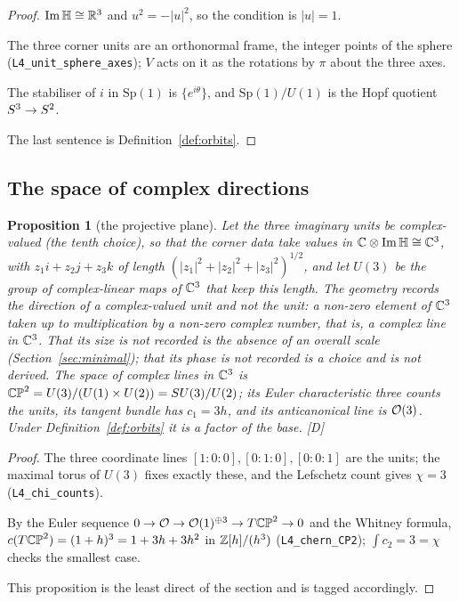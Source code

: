 \documentclass[11pt,a4paper]{article}
\theoremstyle{plain}
\newtheorem{proposition}[theorem]{Proposition}
\theoremstyle{definition}
\theoremstyle{remark}
\newcommand{\Hquat}{\mathbb{H}}
\newcommand{\ImH}{\operatorname{Im}\Hquat}
\newcommand{\rigD}{[\textup{D}]}
\begin{document}
\begin{proof}
$\ImH\cong\R^{3}$ and $u^{2}=-\lvert u\rvert^{2}$, so the condition is $\lvert u\rvert=1$.

The three corner units are an orthonormal frame, the integer points of the sphere (\texttt{L4\_unit\_sphere\_axes}); $V$ acts on it as the rotations by $\pi$ about the three axes.

The stabiliser of $i$ in $\mathrm{Sp}(1)$ is $\{e^{i\theta}\}$, and $\mathrm{Sp}(1)/U(1)$ is the Hopf quotient $S^{3}\to S^2$.

The last sentence is Definition~\ref{def:orbits}.
\end{proof}

\subsection{The space of complex directions}

\begin{proposition}[the projective plane]\label{prop:CP2}
Let the three imaginary units be complex-valued (the tenth choice), so that the corner data take values in $\C\otimes\ImH\cong\C^{3}$, with $z_{1}i+z_{2}j+z_{3}k$ of length $(\lvert z_{1}\rvert^{2}+\lvert z_{2}\rvert^{2}+\lvert z_{3}\rvert^{2})^{1/2}$, and let $U(3)$ be the group of complex-linear maps of $\mathbb{C}^{3}$ that keep this length. The geometry records the direction of a complex-valued unit and not the unit: a non-zero element of $\mathbb{C}^{3}$ taken up to multiplication by a non-zero complex number, that is, a complex line in $\mathbb{C}^{3}$. That its size is not recorded is the absence of an overall scale (Section~\ref{sec:minimal}); that its phase is not recorded is a choice and is not derived. The space of complex lines in $\mathbb{C}^{3}$ is $\mathbb{CP}^2=U(3)/(U(1)\times U(2))=SU(3)/U(2)$; its Euler characteristic three counts the units, its tangent bundle has $c_{1}=3h$, and its anticanonical line is $\mathcal{O}(3)$. Under Definition~\ref{def:orbits} it is a factor of the base. \rigD
\end{proposition}

\begin{proof}
The three coordinate lines $[1{:}0{:}0],[0{:}1{:}0],[0{:}0{:}1]$ are the units; the maximal torus of $U(3)$ fixes exactly these, and the Lefschetz count gives $\chi=3$ (\texttt{L4\_chi\_counts}).

By the Euler sequence $0\to\mathcal{O}\to\mathcal{O}(1)^{\oplus3}\to T\mathbb{CP}^2\to0$ and the Whitney formula, $c(T\mathbb{CP}^2)=(1+h)^{3}=1+3h+3h^{2}$ in $\mathbb{Z}[h]/(h^{3})$ \cite{GriffithsHarris} (\texttt{L4\_chern\_CP2}); $\int c_{2}=3=\chi$ checks the smallest case.

This proposition is the least direct of the section and is tagged accordingly.
\end{proof}
\end{document}
